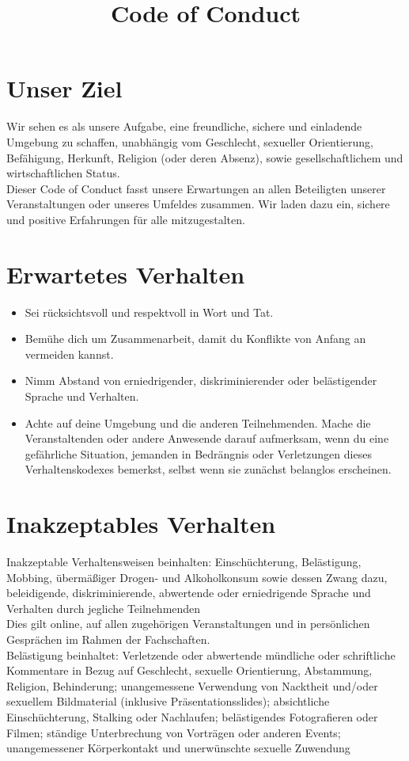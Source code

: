 \documentclass{article}
\title{Code of Conduct}
\begin{document}
\maketitle

\section{Unser Ziel}
Wir sehen es als unsere Aufgabe, eine freundliche, sichere und einladende Umgebung zu schaffen, unabhängig vom Geschlecht, sexueller Orientierung, Befähigung, Herkunft, Religion (oder deren Absenz), sowie gesellschaftlichem und wirtschaftlichen Status.
\\
Dieser Code of Conduct fasst unsere Erwartungen an allen Beteiligten unserer Veranstaltungen oder unseres Umfeldes zusammen. Wir laden dazu ein, sichere und positive Erfahrungen für alle mitzugestalten.

\section{Erwartetes Verhalten}
\begin{itemize}
    \item Sei rücksichtsvoll und respektvoll in Wort und Tat.
    \item Bemühe dich um Zusammenarbeit, damit du Konflikte von Anfang an vermeiden kannst.
    \item Nimm Abstand von erniedrigender, diskriminierender oder belästigender Sprache und Verhalten.
    \item Achte auf deine Umgebung und die anderen Teilnehmenden. Mache die Veranstaltenden oder andere Anwesende darauf aufmerksam, wenn du eine gefährliche Situation, jemanden in Bedrängnis oder Verletzungen dieses Verhaltenskodexes bemerkst, selbst wenn sie zunächst belanglos erscheinen.
\end{itemize}

\section{Inakzeptables Verhalten}
Inakzeptable Verhaltensweisen beinhalten: Einschüchterung, Belästigung, Mobbing, übermäßiger Drogen- und Alkoholkonsum sowie dessen Zwang dazu, beleidigende, diskriminierende, abwertende oder erniedrigende Sprache und Verhalten durch jegliche Teilnehmenden
\\ 
Dies gilt online, auf allen zugehörigen Veranstaltungen und in persönlichen Gesprächen im Rahmen der Fachschaften.
\\
Belästigung beinhaltet: Verletzende oder abwertende mündliche oder schriftliche Kommentare in Bezug auf Geschlecht, sexuelle Orientierung, Abstammung, Religion, Behinderung; unangemessene Verwendung von Nacktheit und/oder sexuellem Bildmaterial (inklusive Präsentationsslides); absichtliche Einschüchterung, Stalking oder Nachlaufen; belästigendes Fotografieren oder Filmen; ständige Unterbrechung von Vorträgen oder anderen Events; unangemessener Körperkontakt und unerwünschte sexuelle Zuwendung
\end{document}
